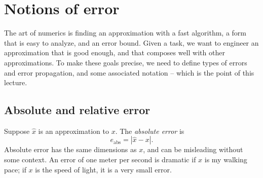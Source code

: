 \documentclass[12pt, leqno]{article}
\begin{document}

\section{Notions of error}

The art of numerics is finding an approximation with a fast algorithm,
a form that is easy to analyze, and an error bound.  Given a task, we
want to engineer an approximation that is good enough, and that
composes well with other approximations.  To make these goals precise,
we need to define types of errors and error propagation, and some
associated notation -- which is the point of this lecture.

\subsection{Absolute and relative error}

Suppose $\hat{x}$ is an approximation to $x$.
The {\em absolute error} is
\[
  e_{\mathrm{abs}} = |\hat{x}-x|.
\]
Absolute error has the same dimensions as $x$,
and can be misleading without some context.  An error
of one meter per second is dramatic if $x$ is my walking
pace; if $x$ is the speed of light, it is a very small error.
\end{document}
